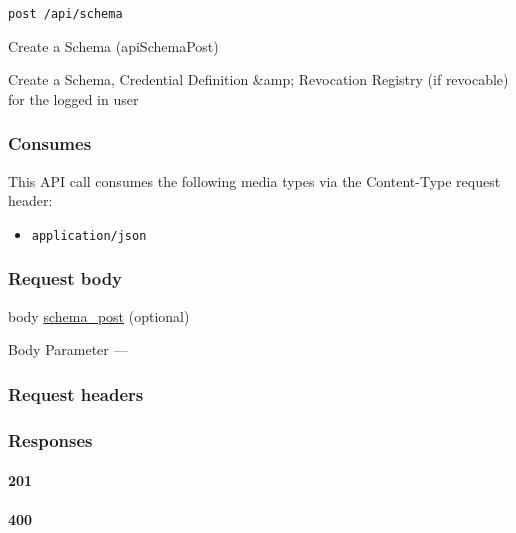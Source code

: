 \protect\hypertarget{apiSchemaPost}{}{}

\begin{verbatim}
post /api/schema
\end{verbatim}

Create a Schema ({apiSchemaPost})

Create a Schema, Credential Definition \&amp; Revocation Registry (if
revocable) for the logged in user

\hypertarget{consumes-25}{%
\subsubsection{Consumes}\label{consumes-25}}

This API call consumes the following media types via the {Content-Type}
request header:

\begin{itemize}
\tightlist
\item
  \texttt{application/json}
\end{itemize}

\hypertarget{request-body-25}{%
\subsubsection{Request body}\label{request-body-25}}

body \protect\hyperlink{schema_post}{schema\_post} (optional)

{Body Parameter} ---

\hypertarget{request-headers-44}{%
\subsubsection{Request headers}\label{request-headers-44}}

\hypertarget{responses-77}{%
\subsubsection{Responses}\label{responses-77}}

\hypertarget{section-253}{%
\paragraph{201}\label{section-253}}

\protect\hyperlink{}{}

\hypertarget{section-254}{%
\paragraph{400}\label{section-254}}

